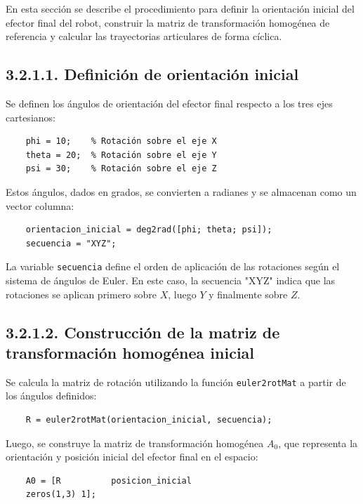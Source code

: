 En esta sección se describe el procedimiento para definir la orientación inicial del efector final del robot, construir la matriz de transformación homogénea de referencia y calcular las trayectorias articulares de forma cíclica.

\subsection*{3.2.1.1. Definición de orientación inicial}

Se definen los ángulos de orientación del efector final respecto a los tres ejes cartesianos:

\begin{verbatim}
	phi = 10;    % Rotación sobre el eje X
	theta = 20;  % Rotación sobre el eje Y
	psi = 30;    % Rotación sobre el eje Z
\end{verbatim}

Estos ángulos, dados en grados, se convierten a radianes y se almacenan como un vector columna:

\begin{verbatim}
	orientacion_inicial = deg2rad([phi; theta; psi]);
	secuencia = "XYZ";
\end{verbatim}

La variable \texttt{secuencia} define el orden de aplicación de las rotaciones según el sistema de ángulos de Euler. En este caso, la secuencia "XYZ" indica que las rotaciones se aplican primero sobre \(X\), luego \(Y\) y finalmente sobre \(Z\).

\subsection*{3.2.1.2. Construcción de la matriz de transformación homogénea inicial}

Se calcula la matriz de rotación utilizando la función \texttt{euler2rotMat} a partir de los ángulos definidos:

\begin{verbatim}
	R = euler2rotMat(orientacion_inicial, secuencia);
\end{verbatim}

Luego, se construye la matriz de transformación homogénea \( A_0 \), que representa la orientación y posición inicial del efector final en el espacio:

\begin{verbatim}
	A0 = [R          posicion_inicial
	zeros(1,3) 1];
\end{verbatim}

